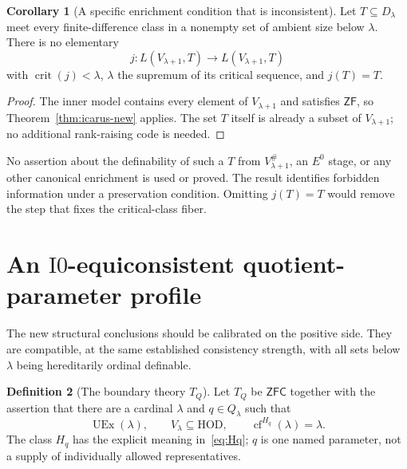 \documentclass[11pt,letterpaper]{article}
\theoremstyle{definition}
\newtheorem{definition}{Definition}[section]
\newtheorem{corollary}[definition]{Corollary}
\numberwithin{equation}{section}
\newcommand{\ZFC}{\mathsf{ZFC}}
\newcommand{\ZF}{\mathsf{ZF}}
\newcommand{\HOD}{\mathrm{HOD}}
\newcommand{\UEx}{\operatorname{UEx}}
\newcommand{\crit}{\operatorname{crit}}
\newcommand{\cf}{\operatorname{cf}}
\newcommand{\Izero}{\mathrm{I0}}
\newcommand{\Dlam}{D_\lambda}
\newcommand{\Qlam}{Q_\lambda}
\begin{document}
\begin{corollary}[A specific enrichment condition that is inconsistent]\label{cor:icarus}
Let $T\subseteq\Dlam$ meet every finite-difference class in a nonempty set of ambient size below $\lambda$. There is no elementary
\[
j:L(V_{\lambda+1},T)\longrightarrow L(V_{\lambda+1},T)
\]
with $\crit(j)<\lambda$, $\lambda$ the supremum of its critical sequence, and $j(T)=T$.
\end{corollary}

\begin{proof}
The inner model contains every element of $V_{\lambda+1}$ and satisfies $\ZF$, so Theorem~\ref{thm:icarus-new} applies. The set $T$ itself is already a subset of $V_{\lambda+1}$; no additional rank-raising code is needed.
\end{proof}

No assertion about the definability of such a $T$ from $V_{\lambda+1}^{\#}$, an $E^0$ stage, or any other canonical enrichment is used or proved. The result identifies forbidden information under a preservation condition. Omitting $j(T)=T$ would remove the step that fixes the critical-class fiber.

\section{An \texorpdfstring{$\Izero$}{I0}-equiconsistent quotient-parameter profile}\label{sec:calibration}

The new structural conclusions should be calibrated on the positive side. They are compatible, at the same established consistency strength, with all sets below $\lambda$ being hereditarily ordinal definable.

\begin{definition}[The boundary theory $T_Q$]\label{def:TQ}
Let $T_Q$ be $\ZFC$ together with the assertion that there are a cardinal $\lambda$ and $q\in\Qlam$ such that
\[
\UEx(\lambda),\qquad V_\lambda\subseteq\HOD,
\qquad \cf^{H_q}(\lambda)=\lambda.
\]
The class $H_q$ has the explicit meaning in~\eqref{eq:Hq}; $q$ is one named parameter, not a supply of individually allowed representatives.
\end{definition}
\end{document}
